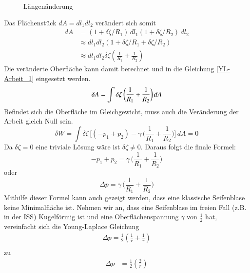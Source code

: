 \begin{refsection}
\begin{figure}
  \caption{Längenänderung} 
  \label{fig:Strahlensatz}
\end{figure}
Das Flächenstück $dA=dl_1 dl_2$ verändert sich somit
\begin{equation}
\begin{split}
dA &= (1+\delta\zeta/R_1)\, dl_1 (1+\delta\zeta/R_2) \, dl_2 \\
&\approx dl_1 dl_2 (1+\delta\zeta/R_1 + \delta\zeta/R_2) \\
&\approx dl_1 dl_2 \delta\zeta (\frac{1}{R_1}+\frac{1}{R_2})
\end{split}
\end{equation} 
Die veränderte Oberfläche kann damit berechnet und in die Gleichung \ref{YL-Arbeit_1} eingesetzt werden. 
\begin{equation}
\delta A = \int \delta\zeta \, \bigg( \frac{1}{R_1}+\frac{1}{R_2} \bigg)\,dA \\
\end{equation}
Befindet sich die Oberfläche im Gleichgewicht, muss auch die Veränderung der Arbeit gleich Null sein.
\begin{equation}
\delta W = \int \delta\zeta \, \bigg[ (-p_1+p_2)-\gamma \, \bigg( \frac{1}{R_1}+\frac{1}{R_2} \bigg) \bigg]\,dA =0
\end{equation}
Da $\delta\zeta=0$ eine triviale Lösung wäre ist $\delta\zeta \neq 0$. Daraus folgt die finale Formel:
\begin{equation}
-p_1+p_2 = \gamma \, \bigg( \frac{1}{R_1}+\frac{1}{R_2} \bigg)
\end{equation}
oder
\begin{equation}\label{Young-Laplace}
\Delta p = \gamma \, \bigg( \frac{1}{R_1}+\frac{1}{R_2} \bigg)
\end{equation}
Mithilfe dieser Formel kann auch gezeigt werden, dass eine klassische Seifenblase keine Minimalfläche ist. Nehmen wir an, dass eine Seifenblase im freien Fall (z.B. in der ISS) Kugelförmig ist und eine Oberflächenspannung $\gamma$ von $\frac{1}{2}$ hat, vereinfacht sich die Young-Laplace Gleichung
\begin{equation}\label{eq:Sphere}
\begin{split}
\Delta p = \frac{1}{2}(\frac{1}{r}+\frac{1}{r}) \\
\end{split}
\end{equation}
zu
\begin{equation}
\begin{split}
\Delta p &= \frac{1}{2}(\frac{2}{r})\\

\end{split}
\end{equation}
\end{refsection}
